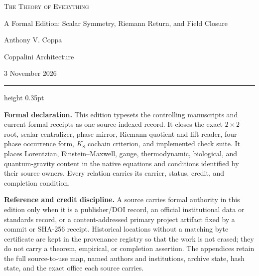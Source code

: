 \documentclass[10pt]{article}
\begin{document}
\begin{center}
{\LARGE\scshape The Theory of Everything\par}
\vspace{0.15em}
{\large A Formal Edition: Scalar Symmetry, Riemann Return, and Field Closure\par}
\vspace{0.8em}
{\normalsize Anthony V. Coppa\par}
{\small Coppalini Architecture\par}
\vspace{0.35em}
{\small 3 November 2026\par}
\end{center}

\vspace{0.5em}
\hrule height 0.35pt
\vspace{0.75em}

\noindent\textbf{Formal declaration.}
This edition typesets the controlling manuscripts and current formal receipts as
one source-indexed record.  It closes the exact $2\times2$ root, scalar
centralizer, phase mirror, Riemann quotient-and-lift reader, four-phase
occurrence form, $K_8$ cochain criterion, and implemented check suite.  It
places Lorentzian, Einstein--Maxwell, gauge, thermodynamic, biological, and
quantum-gravity content in the native equations and conditions identified by
their source owners.  Every relation carries its carrier, status, credit, and
completion condition.

\medskip
\noindent\textbf{Reference and credit discipline.}
A source carries formal authority in this edition only when it is a
publisher/DOI record, an official institutional data or standards record, or
a content-addressed primary project artifact fixed by a commit or SHA-256
receipt.  Historical locations without a matching byte certificate are kept
in the provenance registry so that the work is not erased; they do not carry
a theorem, empirical, or completion assertion.  The appendices retain the
full source-to-use map, named authors and institutions, archive state, hash
state, and the exact office each source carries.


\end{document}
